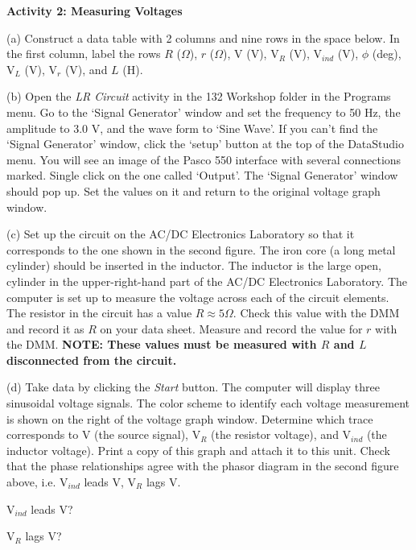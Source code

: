 \textbf{Activity 2: Measuring Voltages} 

(a) Construct a data table with 2 columns and nine rows in the space
below. In the first column, label the rows $R$ (\( \Omega  \)), $r$ (\( \Omega  \)), V (V),
V\( _{R} \) (V), V\( _{ind} \) (V), \( \phi  \) (deg), V\( _{L} \)
(V), V\( _{r} \) (V), and $L$ (H).
\vspace{4in}

(b) Open the \emph{LR Circuit} activity
in the 132 Workshop folder in the Programs menu. 
Go to the `Signal Generator' window and set the frequency to 50 Hz, the amplitude 
to 3.0 V, and the wave form to `Sine Wave'.
If you can't find the `Signal Generator' window, click the `setup' button at
the top of the DataStudio menu.
You will see an image of the Pasco 550 interface with several
connections marked.
Single click on the one called `Output'.
The `Signal Generator' window should pop up. 
Set the values on it and return to the original voltage graph window.

(c) Set up the circuit on the AC/DC Electronics Laboratory so that it corresponds to the one shown in the second figure. The iron core (a long metal cylinder) should be inserted in the inductor. The inductor is the large open, cylinder in the upper-right-hand part of the AC/DC Electronics Laboratory.
The computer is set up to measure the voltage
across each of the circuit elements. The resistor in the circuit 
has a value $R\approx 5\Omega$. Check this value with the DMM and record it
as $R$ on your data sheet. Measure and record the value for $r$ with the DMM.
\textbf{NOTE: These values must be measured with $R$ and $L$ disconnected from the circuit.}

(d) Take data by clicking the \emph{Start} button. The computer will display three sinusoidal
voltage signals. The color scheme to identify each voltage measurement
is shown on the right of the voltage graph window. Determine which trace
corresponds to V (the source signal), V\( _{R} \) (the resistor voltage), and V\( _{ind} \) (the inductor voltage). 
Print a copy of this graph and attach it to this unit.
Check that the phase relationships agree with
the phasor diagram in the second figure above, i.e. V\( _{ind} \) leads V, V\( _{R} \) lags V.
\vspace{5.0mm}

\hspace{2.0in} V\( _{ind} \) leads V?
\vspace{5.0mm}

\hspace{2.0in} V\( _{R} \) lags V?
\vspace{5.0mm}

